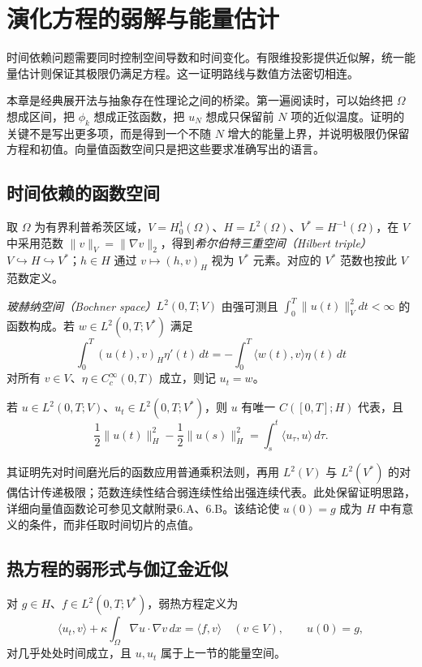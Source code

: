 \setcounter{chapter}{14} %
\chapter{演化方程的弱解与能量估计}
\label{chap:evolution-weak}

时间依赖问题需要同时控制空间导数和时间变化。有限维投影提供近似解，统一能量估计则保证其极限仍满足方程。这一证明路线与数值方法密切相连。

本章是经典展开法与抽象存在性理论之间的桥梁。第一遍阅读时，可以始终把 $\Omega$ 想成区间，把 $\phi_k$ 想成正弦函数，把 $u_N$ 想成只保留前 $N$ 项的近似温度。证明的关键不是写出更多项，而是得到一个不随 $N$ 增大的能量上界，并说明极限仍保留方程和初值。向量值函数空间只是把这些要求准确写出的语言。

\section{时间依赖的函数空间}
取 $\Omega$ 为有界利普希茨区域，$V=H_0^1(\Omega)$、$H=L^2(\Omega)$、$V^*=H^{-1}(\Omega)$，在 $V$ 中采用范数 $\|v\|_V=\|\nabla v\|_2$，得到\emph{希尔伯特三重空间（Hilbert triple）}$V\hookrightarrow H\hookrightarrow V^*$；$h\in H$ 通过 $v\mapsto(h,v)_H$ 视为 $V^*$ 元素。对应的 $V^*$ 范数也按此 $V$ 范数定义。

\emph{玻赫纳空间（Bochner space）}$L^2(0,T;V)$ 由强可测且 $\int_0^T\|u(t)\|_V^2dt<\infty$ 的函数构成。若 $w\in L^2(0,T;V^*)$ 满足
\[
 \int_0^T(u(t),v)_H\eta'(t)\,dt
 =-\int_0^T\langle w(t),v\rangle\eta(t)\,dt
\]
对所有 $v\in V$、$\eta\in C_c^\infty(0,T)$ 成立，则记 $u_t=w$。

\begin{theorem}[能量空间的时间连续性]
若 $u\in L^2(0,T;V)$、$u_t\in L^2(0,T;V^*)$，则 $u$ 有唯一 $C([0,T];H)$ 代表，且
\begin{equation}
 \frac12\|u(t)\|_H^2-\frac12\|u(s)\|_H^2
 =\int_s^t\langle u_\tau,u\rangle\,d\tau.
 \label{eq:hilbert-triple-energy}
\end{equation}
\end{theorem}
其证明先对时间磨光后的函数应用普通乘积法则，再用 $L^2(V)$ 与 $L^2(V^*)$ 的对偶估计传递极限；范数连续性结合弱连续性给出强连续代表。此处保留证明思路，详细向量值函数论可参见文献\cite{hunter}附录6.A、6.B。该结论使 $u(0)=g$ 成为 $H$ 中有意义的条件，而非任取时间切片的点值。

\section{热方程的弱形式与伽辽金近似}
对 $g\in H$、$f\in L^2(0,T;V^*)$，弱热方程定义为
\begin{equation}
 \langle u_t,v\rangle+\kappa\int_\Omega\nabla u\cdot\nabla v\,dx
 =\langle f,v\rangle\quad(v\in V),\qquad u(0)=g,
 \label{eq:weak-heat}
\end{equation}
对几乎处处时间成立，且 $u,u_t$ 属于上一节的能量空间。

